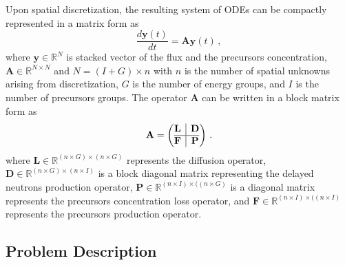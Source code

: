 \documentclass[]{interact}
\theoremstyle{plain}%
\theoremstyle{definition}
\theoremstyle{remark}
\begin{document}
Upon spatial discretization, the resulting system of ODEs can be compactly represented in a matrix form as  
\begin{equation}
	\frac{d\mathbf{y}(t)}{dt} = \mathbf{A}\mathbf{y}(t) \, ,
	\label{eq:transient fom}
\end{equation}
where $\mathbf{y}\in\mathbb{R}^{N}$ is stacked vector of the flux and the precursors concentration, $\mathbf{A}\in\mathbb{R}^{N\times N}$ and $N = (I + G)\times n$ with $n$ is the number of spatial unknowns arising from discretization, $G$ is the number of energy groups, and $I$ is the number of precursors groups.
The operator $\mathbf{A}$ can be written in a block matrix form as
\begin{equation}
	\mathbf{A} =  \left(\begin{array}{@{}c|c@{}}
	\mathbf{L} & \mathbf{D} \\
	\hline
	\mathbf{F} & \mathbf{P}
	\end{array}\right) \, .
\end{equation} 
where $\mathbf{L} \in \mathbb{R}^{(n\times G)\times (n\times G)}$ represents the diffusion operator,
$\mathbf{D} \in \mathbb{R}^{(n\times G)\times (n\times I)}$ is a block diagonal matrix representing the delayed neutrons production operator,
$\mathbf{P} \in \mathbb{R}^{(n\times I)\times ((n\times G)}$ is a diagonal matrix represents the precursors concentration loss operator, 
and $\mathbf{F}\in \mathbb{R}^{(n\times I)\times ((n\times I)}$ represents the precursors production operator.

\subsection{Problem Description}
\end{document}
